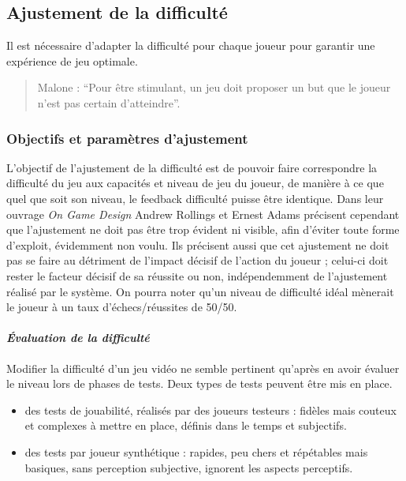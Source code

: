 	\subsection{Ajustement de la difficulté}
Il est nécessaire d'adapter la difficulté pour chaque joueur pour garantir une expérience de jeu optimale.			
\begin{quote}Malone : “Pour être stimulant, un jeu doit proposer un but que le joueur n’est pas certain d’atteindre”.
\end{quote}

	\subsubsection{Objectifs et paramètres d'ajustement}
L’objectif de l’ajustement de la difficulté est de pouvoir faire correspondre la difficulté du jeu aux capacités et niveau de jeu du joueur, de manière à ce que quel que soit son niveau, le feedback difficulté puisse être identique. Dans leur ouvrage \emph{On Game Design} \cite{Andr03} Andrew Rollings et Ernest Adams précisent cependant que l’ajustement ne doit pas être trop évident ni visible, afin d’éviter toute forme d’exploit, évidemment non voulu. Ils précisent aussi que cet ajustement ne doit pas se faire au détriment de l’impact décisif de l’action du joueur ; celui-ci doit rester le facteur décisif de sa réussite ou non, indépendemment de l’ajustement réalisé par le système. On pourra noter qu’un niveau de difficulté idéal mènerait le joueur à un taux d’échecs/réussites de 50/50.

		\paragraph{\emph{Évaluation de la difficulté}\\ \quad}
Modifier la difficulté d'un jeu vidéo ne semble pertinent qu'après en avoir évaluer le niveau lors de phases de tests. Deux types de tests peuvent être mis en place. 
\begin{itemize}
	\item des tests de jouabilité, réalisés par des joueurs testeurs : fidèles mais couteux et complexes à mettre en place, définis dans le temps et subjectifs.
	\item des tests par joueur synthétique : rapides, peu chers et répétables mais basiques, sans perception subjective, ignorent les aspects perceptifs.
\end {itemize} 

